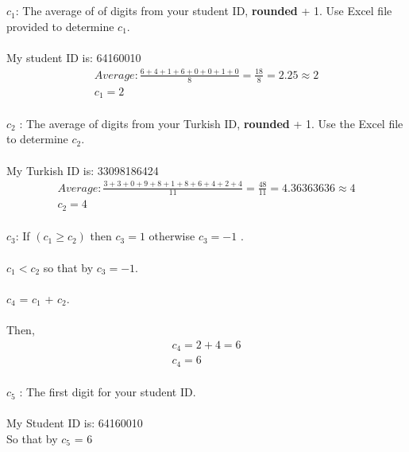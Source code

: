 \documentclass[a4paper, 11pt]{report}
\begin{document}
{
\\ \\
$c_1$: The average of of digits from your student ID, \textbf{rounded} + 1. Use Excel file provided
to determine $c_1$.
\\ \\ My student ID is: 64160010
\begin{align*}
Average : \frac{6+4+1+6+0+0+1+0}{8} = \frac{18}{8} = 2.25 \approx 2 \\
c_1 = 2
\end{align*}
\\
$c_2$ : The average of digits from your Turkish ID, \textbf{rounded} + 1. Use the Excel file to determine $c_2$.
\\ \\
My Turkish ID is: 33098186424
\begin{align*}
Average: \frac{3+3+0+9+8+1+8+6+4+2+4}{11} = \frac{48}{11} = 4.36363636 \approx 4 \\
c_2 = 4
\end{align*}
\\
$c_3$: If $(c_1 \geq c_2)$ then $c_3 = 1$ otherwise $c_3 = -1$ .
\\ \\
$c_1 < c_2$ so that by $c_3 = -1$.
\\ \\
$c_4$ = $c_1$ + $c_2$.
\\ \\
Then,
\begin{align*}
c_4 = 2 + 4 = 6\\
c_4 = 6
\end{align*}
\\
$c_5$ : The first digit for your student ID.
\\ \\
My Student ID is: 64160010
\\ So that by $c_5$ = 6
\newpage
}
\end{document}
